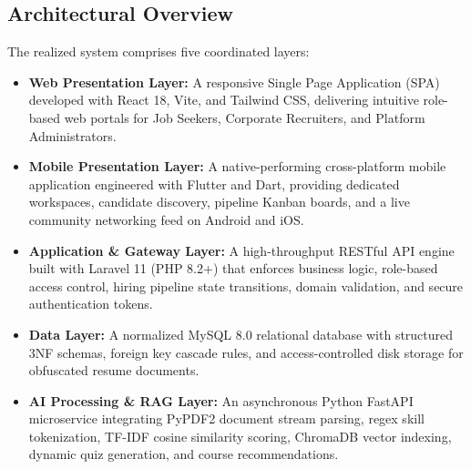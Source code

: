 \subsection{Architectural Overview}
The realized system comprises five coordinated layers:
\begin{itemize}
    \item \textbf{Web Presentation Layer:} A responsive Single Page Application (SPA) developed with React 18, Vite, and Tailwind CSS, delivering intuitive role-based web portals for Job Seekers, Corporate Recruiters, and Platform Administrators.
    \item \textbf{Mobile Presentation Layer:} A native-performing cross-platform mobile application engineered with Flutter and Dart, providing dedicated workspaces, candidate discovery, pipeline Kanban boards, and a live community networking feed on Android and iOS.
    \item \textbf{Application \& Gateway Layer:} A high-throughput RESTful API engine built with Laravel 11 (PHP 8.2+) that enforces business logic, role-based access control, hiring pipeline state transitions, domain validation, and secure authentication tokens.
    \item \textbf{Data Layer:} A normalized MySQL 8.0 relational database with structured 3NF schemas, foreign key cascade rules, and access-controlled disk storage for obfuscated resume documents.
    \item \textbf{AI Processing \& RAG Layer:} An asynchronous Python FastAPI microservice integrating PyPDF2 document stream parsing, regex skill tokenization, TF-IDF cosine similarity scoring, ChromaDB vector indexing, dynamic quiz generation, and course recommendations.
\end{itemize}

